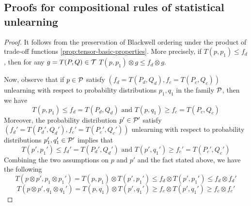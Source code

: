\subsection{Proofs for compositional rules of statistical unlearning}
\CDU*
\begin{proof}
    It follows from the preservation of Blackwell ordering under the product of trade-off functions \ref{prop:tensor-basic-properties}. More precisely,  if $T(p,p_1)\leq f_d$, then for any  $g=T(P,Q)\in \mathcal{T}$ $T(p,p_1)\otimes g \leq f_d\otimes g$. 
    
    Now, observe that if $p \in \mathcal{P}$ satisfy $(f_d=T(P_d,Q_d),f_c=T(P_c,Q_c))$ unlearning with respect to  probability distributions $p_1,q_1$ in the family $\mathcal{P}$, then we have
    \[
    T(p,p_1) \leq f_d= T(P_d,Q_d) \text{ and } T(p,q_1) \geq f_c = T(P_c,Q_c)
    \]
    Moreover, the probability distribution $p' \in \mathcal{P}'$ satisfy $(f_d'=T(P_d',Q_d'),f_c'=T(P_c',Q_c'))$ unlearning with respect to  probability distributions $p_1',q_1'\in \mathcal{P}'$ implies that 
    \[
    T(p',p_1') \leq f_d'= T(P_d',Q_d') \text{ and } T(p',q_1') \geq f_c'= T(P_c',Q_c')
    \]
    Combining the two assumptions on $p$ and $p'$ and the fact stated above, we have the following 
    \begin{equation}
       T(p\otimes p', p_1\otimes p_1')
       =
       T(p,p_1) \otimes  T(p',p_1') 
       \leq
       f_d \otimes T(p',p_1') 
       \leq 
       f_d\otimes f_d'
    \end{equation}
    \begin{equation}
        T(p\otimes p', q_1\otimes q_1') 
        =
        T(p,q_1) \otimes  T(p',q_1') 
        \geq 
        f_c \otimes  T(p',q_1') 
        \geq f_c\otimes f_c'
    \end{equation}
\end{proof}
